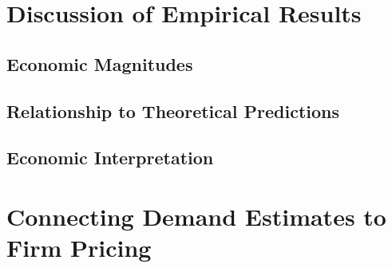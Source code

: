 \documentclass[12pt]{article}
\theoremstyle{definition}
\theoremstyle{remark}
\begin{document}
%
%
%
%



\section{Discussion of Empirical Results}
\label{sec:empirical-discussion}

\subsection{Economic Magnitudes}

\subsection{Relationship to Theoretical Predictions}

\subsection{Economic Interpretation}



\section{Connecting Demand Estimates to Firm Pricing}
\label{sec:supply-demand}
\end{document}

